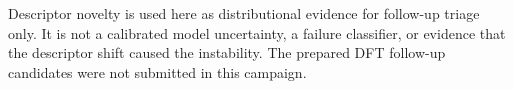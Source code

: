 Descriptor novelty is used here as distributional evidence for follow-up triage only. It is not a calibrated model uncertainty, a failure classifier, or evidence that the descriptor shift caused the instability. The prepared DFT follow-up candidates were not submitted in this campaign.
